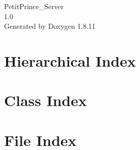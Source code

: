 \documentclass[twoside]{book}
\newcommand{\+}{\discretionary{\mbox{\scriptsize$\hookleftarrow$}}{}{}}
\newcommand{\clearemptydoublepage}{%
  \newpage{\pagestyle{empty}\cleardoublepage}%
}
\begin{document}
\hypersetup{pageanchor=false,
             bookmarksnumbered=true,
             pdfencoding=unicode
            }
\begin{titlepage}
\vspace*{7cm}
\begin{center}%
{\Large Petit\+Prince\+\_\+\+Server \\[1ex]\large 1.\+0 }\\
\vspace*{1cm}
{\large Generated by Doxygen 1.8.11}\\
\end{center}
\end{titlepage}
\clearemptydoublepage
\tableofcontents
\clearemptydoublepage
{}
\hypersetup{pageanchor=true}

\chapter{Hierarchical Index}

\chapter{Class Index}

\chapter{File Index}

\end{document}
